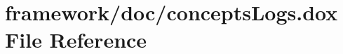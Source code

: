 \hypertarget{concepts_logs_8dox}{}\section{framework/doc/concepts\+Logs.dox File Reference}
\label{concepts_logs_8dox}
